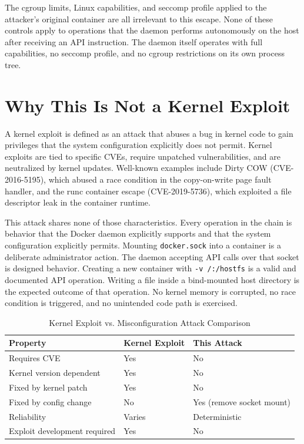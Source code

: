 The cgroup limits, Linux capabilities, and seccomp profile applied to the attacker's original container are all irrelevant to this escape. None of these controls apply to operations that the daemon performs autonomously on the host after receiving an API instruction. The daemon itself operates with full capabilities, no seccomp profile, and no cgroup restrictions on its own process tree.

\vspace{0.3cm}

\section{Why This Is Not a Kernel Exploit}

A kernel exploit is defined as an attack that abuses a bug in kernel code to gain privileges that the system configuration explicitly does not permit. Kernel exploits are tied to specific CVEs, require unpatched vulnerabilities, and are neutralized by kernel updates. Well-known examples include Dirty COW (CVE-2016-5195), which abused a race condition in the copy-on-write page fault handler, and the runc container escape (CVE-2019-5736), which exploited a file descriptor leak in the container runtime.

This attack shares none of those characteristics. Every operation in the chain is behavior that the Docker daemon explicitly supports and that the system configuration explicitly permits. Mounting \texttt{docker.sock} into a container is a deliberate administrator action. The daemon accepting API calls over that socket is designed behavior. Creating a new container with \texttt{-v /:/hostfs} is a valid and documented API operation. Writing a file inside a bind-mounted host directory is the expected outcome of that operation. No kernel memory is corrupted, no race condition is triggered, and no unintended code path is exercised.

\begin{table}[h]
\centering
\caption{Kernel Exploit vs. Misconfiguration Attack Comparison}
\label{tab:exploit_comparison}
\begin{tabular}{|l|l|l|}
\hline
\textbf{Property} & \textbf{Kernel Exploit} & \textbf{This Attack} \\
\hline
Requires CVE & Yes & No \\
Kernel version dependent & Yes & No \\
Fixed by kernel patch & Yes & No \\
Fixed by config change & No & Yes (remove socket mount) \\
Reliability & Varies & Deterministic \\
Exploit development required & Yes & No \\
\hline
\end{tabular}
\end{table}

